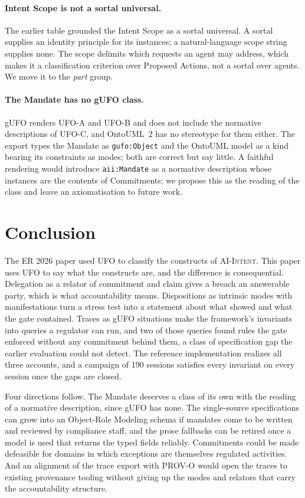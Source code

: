 \documentclass[runningheads]{llncs}
\newcommand{\uml}[1]{\guillemotleft #1\guillemotright}
\newcommand{\code}[1]{\texttt{#1}}
\begin{document}
\paragraph{Intent Scope is not a sortal universal.}
The earlier table grounded the Intent Scope as a sortal universal. A sortal supplies an identity principle for its instances; a natural-language scope string supplies none. The scope delimits which requests an agent may address, which makes it a classification criterion over Proposed Actions, not a sortal over agents. We move it to the \emph{part} group.

\paragraph{The Mandate has no gUFO class.}
gUFO renders UFO-A and UFO-B and does not include the normative descriptions of UFO-C, and OntoUML~2 has no stereotype for them either. The export types the Mandate as \code{gufo:Object} and the OntoUML model as a \uml{kind} bearing its constraints as modes; both are correct but say little. A faithful rendering would introduce \code{aii:Mandate} as a normative description whose instances are the contents of Commitments; we propose this as the reading of the class and leave an axiomatisation to future work.

\section{Conclusion}
\label{sec:conclusion}
The ER 2026 paper used UFO to classify the constructs of \textsc{AI-Intent}. This paper uses UFO to say what the constructs are, and the difference is consequential. Delegation as a relator of commitment and claim gives a breach an answerable party, which is what accountability means. Dispositions as intrinsic modes with manifestations turn a stress test into a statement about what showed and what the gate contained. Traces as gUFO situations make the framework's invariants into queries a regulator can run, and two of those queries found rules the gate enforced without any commitment behind them, a class of specification gap the earlier evaluation could not detect. The reference implementation realizes all three accounts, and a campaign of 190 sessions satisfies every invariant on every session once the gaps are closed.

Four directions follow. The Mandate deserves a class of its own with the reading of a normative description, since gUFO has none. The single-source specifications can grow into an Object-Role Modeling schema if mandates come to be written and reviewed by compliance staff, and the prose fallbacks can be retired once a model is used that returns the typed fields reliably. Commitments could be made defeasible for domains in which exceptions are themselves regulated activities. And an alignment of the trace export with PROV-O would open the traces to existing provenance tooling without giving up the modes and relators that carry the accountability structure.



\end{document}
